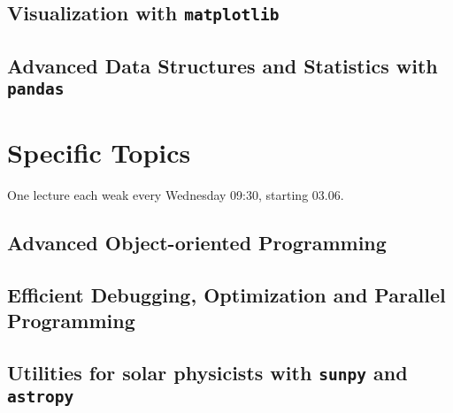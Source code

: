 \documentclass[10pt,a4paper]{article}
\begin{document}
		\subsection{Visualization with \texttt{matplotlib}}
		\subsection{Advanced Data Structures and Statistics with \texttt{pandas}}
	
	\vspace{1cm}
	\section{Specific Topics}
	One lecture each weak every Wednesday 09:30, starting 03.06.
		
		\subsection{Advanced Object-oriented Programming}
		\subsection{Efficient Debugging, Optimization and Parallel Programming}
		\subsection{Utilities for solar physicists with \texttt{sunpy} and \texttt{astropy}}
		
	\thispagestyle{empty}
\end{document}

